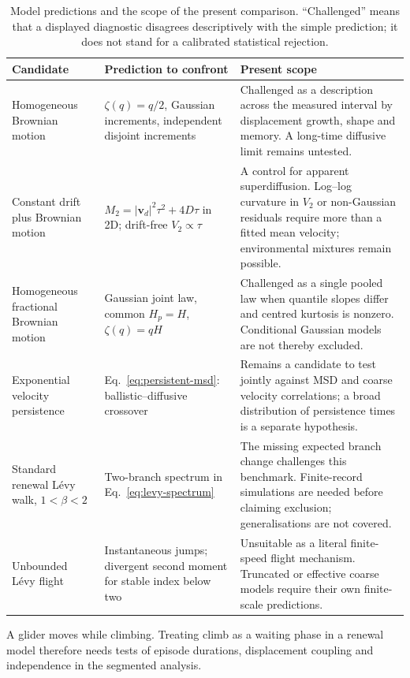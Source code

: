 \begin{table}[htbp]
\centering\small
\renewcommand{\arraystretch}{1.2}
\caption{Model predictions and the scope of the present comparison. ``Challenged''
means that a displayed diagnostic disagrees descriptively with the simple prediction;
it does not stand for a calibrated statistical rejection.}
\label{tab:fingerprint}
\begin{tabular}{@{}>{\raggedright\arraybackslash}p{.22\linewidth}>{\raggedright\arraybackslash}p{.33\linewidth}>{\raggedright\arraybackslash}p{.39\linewidth}@{}}
\toprule
\textbf{Candidate} & \textbf{Prediction to confront} & \textbf{Present scope}\\
\midrule
Homogeneous Brownian motion &
$\zeta(q)=q/2$, Gaussian increments, independent disjoint increments &
Challenged as a description across the measured interval by displacement growth, shape
and memory. A long-time diffusive limit remains untested.\\
\addlinespace
Constant drift plus Brownian motion &
$M_2=|\mathbf v_d|^2\tau^2+4D\tau$ in 2D; drift-free $V_2\propto\tau$ &
A control for apparent superdiffusion. Log--log curvature in $V_2$ or non-Gaussian residuals require more
than a fitted mean velocity; environmental mixtures remain possible.\\
\addlinespace
Homogeneous fractional Brownian motion &
Gaussian joint law, common $H_p=H$, $\zeta(q)=qH$ &
Challenged as a single pooled law when quantile slopes differ and centred kurtosis is
nonzero. Conditional Gaussian models are not thereby excluded.\\
\addlinespace
Exponential velocity persistence &
Eq.~\eqref{eq:persistent-msd}: ballistic--diffusive crossover &
Remains a candidate to test jointly against MSD and coarse velocity correlations;
a broad distribution of persistence times is a separate hypothesis.\\
\addlinespace
Standard renewal L\'evy walk, $1<\beta<2$ &
Two-branch spectrum in Eq.~\eqref{eq:levy-spectrum} &
The missing expected branch change challenges this benchmark. Finite-record simulations
are needed before claiming exclusion; generalisations are not covered.\\
\addlinespace
Unbounded L\'evy flight &
Instantaneous jumps; divergent second moment for stable index below two &
Unsuitable as a literal finite-speed flight mechanism. Truncated or effective coarse
models require their own finite-scale predictions.\\
\bottomrule
\end{tabular}
\end{table}

A glider moves while climbing. Treating climb as a waiting phase in a renewal model
therefore needs tests of episode durations, displacement coupling and independence
in the segmented analysis.
